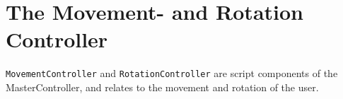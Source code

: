 
\section{The Movement- and Rotation Controller}
\texttt{MovementController} and \texttt{RotationController} are script components of the MasterController, and relates to the movement and rotation of the user.












